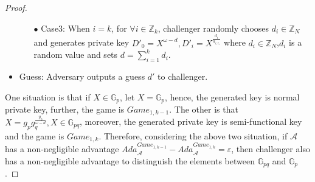 \documentclass[smallextended]{svjour3}       %
\begin{document}
\begin{proof}
\begin{itemize}
\begin{itemize}
			\item[$\bullet$] Case3: When $i=k$, for $\forall i \in \mathbb{Z}_k$, challenger randomly chooses $d_i \in \mathbb{Z}_N$ and generates private key $D'_0=X^{\omega-d}, D'_i=X^{\frac{d_i}{a_{i,t_i}}}$ where $d_i \in \mathbb{Z}_N$,$d_i$ is a random value and sets $d=\sum_{i=1}^{k}d_i$. 
		\end{itemize}
		\item Guess: Adversary outputs a guess $d'$ to challenger.
	\end{itemize}
	One situation is that if $X \in \mathbb{G}_p$, let $X=\mathbb{G}_p$, hence, the generated key is normal private key, further, the game is $Game_{1,k-1}$. The other is that $X=g_pg_q^{\frac{y_0}{\omega -d}},X \in \mathbb{G}_{pq}$, moreover, the generated private key is semi-functional key and the game is $Game_{1,k}$. Therefore, considering the above two situation, if $\mathcal{A}$ has a non-negligible advantage $Ada_{\mathcal{A}}^{Game_{1,k-1}}-Ada_{\mathcal{A}}^{Game_{1,k}}=\varepsilon$, then challenger also has a non-negligible advantage to distinguish the elements between $\mathbb{G}_{pq}$ and $\mathbb{G}_p$.
\end{proof}
\end{document}
